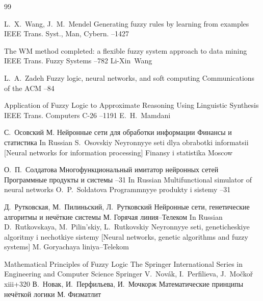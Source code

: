 \begin{thebibliography}{99}

\by L.~X.~Wang, J.~M.~Mendel
\paper Generating fuzzy rules by learning from examples
\jour IEEE Trans. Syst., Man, Cybern.
--1427


\paper The WM method completed: a flexible fuzzy system approach to data mining
\jour IEEE Trans. Fuzzy Systems 
--782
\by Li-Xin~Wang

\by L.~A.~Zadeh
\paper Fuzzy logic, neural networks, and soft computing
\jour Communications of the ACM
--84

\paper  Application of Fuzzy Logic to Approximate Reasoning Using Linguistic Synthesis
\jour IEEE Trans. Computers 
\vol C-26 
--1191
\by E.~H.~Mamdani


\by С.~Осовский
\publaddr М.
\book Нейронные сети для обработки информации
\publ Финансы и статистика
\misctransl
\lang In Russian
\by S.~Osovskiy
\book Neyronnyye seti dlya obrabotki informatsii \rm [Neural networks for information processing]
\publ Finansy i statistika
\publaddr Moscow


\by О.~П.~Солдатова
\paper Многофункциональный имитатор нейронных сетей
\jour Программные продукты и системы
--31
\misctransl
\lang In Russian
\paper Multifunctional simulator of neural networks 
\by O.~P.~Soldatova
\jour Programmnyye produkty i sistemy
--31

\by Д.~Рутковская, М.~Пилиньский, Л.~Рутковский
\book Нейронные сети, генетические алгоритмы и нечёткие системы
\publaddr М.
\publ Горячая линия--Телеком
\misctransl
\lang In Russian
\by D.~Rutkovskaya, M.~Pilin'skiy, L.~Rutkovskiy
\book Neyronnyye seti, geneticheskiye algoritmy i nechotkiye sistemy \rm [Neural networks, genetic algorithms and fuzzy systems]
\publaddr M.
\publ Goryachaya liniya--Telekom

\book Mathematical Principles of Fuzzy Logic
\serial The Springer International Series in Engineering and Computer Science
\publ Springer
\by V.~Nov\'ak, I.~Perfilieva, J.~Mo\v{c}ko\v{r}
\totalpages xiii+320
\rtransl 
\by В.~Новак, И.~Перфильева, И.~Мочкорж
\book Математические принципы нечёткой логики
\publ М.
\publaddr Физматлит


\end{thebibliography}
